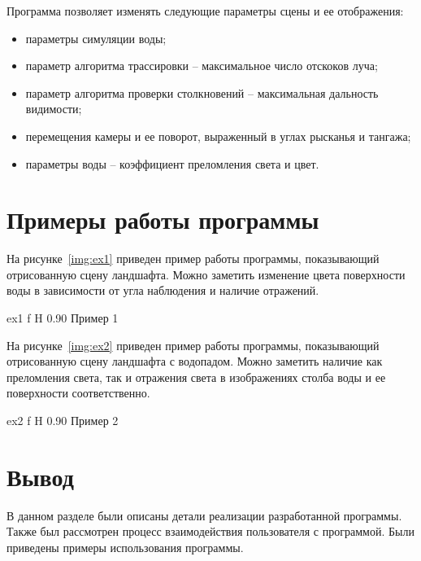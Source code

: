 Программа позволяет изменять следующие параметры сцены и ее отображения:
\begin{itemize}
    \item параметры симуляции воды;
    \item параметр алгоритма трассировки -- максимальное число отскоков луча;
    \item параметр алгоритма проверки столкновений -- максимальная дальность видимости;
    \item перемещения камеры и ее поворот, выраженный в углах рысканья и тангажа;
    \item параметры воды -- коэффициент преломления света и цвет.
\end{itemize}

\section{Примеры работы программы}

На рисунке~\ref{img:ex1} приведен пример работы программы, показывающий отрисованную 
сцену ландшафта. Можно заметить изменение цвета поверхности воды в зависимости
от угла наблюдения и наличие отражений.

    {ex1}
    {f}
    {H}
    {0.90\textwidth}
    {Пример 1}

На рисунке~\ref{img:ex2} приведен пример работы программы, показывающий отрисованную сцену ландшафта
с водопадом. Можно заметить наличие как преломления света, так и отражения света 
в изображениях столба воды и ее поверхности соответственно.

    {ex2}
    {f}
    {H}
    {0.90\textwidth}
    {Пример 2}

\section*{Вывод}

В данном разделе были описаны детали реализации разработанной программы. 
Также был рассмотрен процесс взаимодействия пользователя с программой.
Были приведены примеры использования программы.
